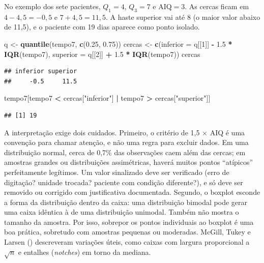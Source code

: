 \documentclass[
]{book}
\newenvironment{Shaded}{\begin{snugshade}}{\end{snugshade}}
\newcommand{\AttributeTok}[1]{\textcolor[rgb]{0.13,0.29,0.53}{#1}}
\newcommand{\DecValTok}[1]{\textcolor[rgb]{0.00,0.00,0.81}{#1}}
\newcommand{\FloatTok}[1]{\textcolor[rgb]{0.00,0.00,0.81}{#1}}
\newcommand{\FunctionTok}[1]{\textcolor[rgb]{0.13,0.29,0.53}{\textbf{#1}}}
\newcommand{\NormalTok}[1]{#1}
\newcommand{\OtherTok}[1]{\textcolor[rgb]{0.56,0.35,0.01}{#1}}
\newcommand{\SpecialCharTok}[1]{\textcolor[rgb]{0.81,0.36,0.00}{\textbf{#1}}}
\newcommand{\StringTok}[1]{\textcolor[rgb]{0.31,0.60,0.02}{#1}}
\begin{document}
No exemplo dos sete pacientes, \(Q_1 = 4\), \(Q_3 = 7\) e \(\text{AIQ} = 3\). As cercas ficam em \(4 - 4{,}5 = -0{,}5\) e \(7 + 4{,}5 = 11{,}5\). A haste superior vai até 8 (o maior valor abaixo de 11,5), e o paciente com 19 dias aparece como ponto isolado.

\begin{Shaded}
\begin{Highlighting}[]
\NormalTok{q }\OtherTok{\textless{}{-}} \FunctionTok{quantile}\NormalTok{(tempo7, }\FunctionTok{c}\NormalTok{(}\FloatTok{0.25}\NormalTok{, }\FloatTok{0.75}\NormalTok{))}
\NormalTok{cercas }\OtherTok{\textless{}{-}} \FunctionTok{c}\NormalTok{(}\AttributeTok{inferior =}\NormalTok{ q[[}\DecValTok{1}\NormalTok{]] }\SpecialCharTok{{-}} \FloatTok{1.5} \SpecialCharTok{*} \FunctionTok{IQR}\NormalTok{(tempo7), }\AttributeTok{superior =}\NormalTok{ q[[}\DecValTok{2}\NormalTok{]] }\SpecialCharTok{+} \FloatTok{1.5} \SpecialCharTok{*} \FunctionTok{IQR}\NormalTok{(tempo7))}
\NormalTok{cercas}
\end{Highlighting}
\end{Shaded}

\begin{verbatim}
## inferior superior 
##     -0.5     11.5
\end{verbatim}

\begin{Shaded}
\begin{Highlighting}[]
\NormalTok{tempo7[tempo7 }\SpecialCharTok{\textless{}}\NormalTok{ cercas[}\StringTok{"inferior"}\NormalTok{] }\SpecialCharTok{|}\NormalTok{ tempo7 }\SpecialCharTok{\textgreater{}}\NormalTok{ cercas[}\StringTok{"superior"}\NormalTok{]]}
\end{Highlighting}
\end{Shaded}

\begin{verbatim}
## [1] 19
\end{verbatim}

A interpretação exige dois cuidados. Primeiro, o critério de 1,5 × AIQ é uma convenção para chamar atenção, e não uma regra para excluir dados. Em uma distribuição normal, cerca de 0,7\% das observações caem além das cercas; em amostras grandes ou distribuições assimétricas, haverá muitos pontos ``atípicos'' perfeitamente legítimos. Um valor sinalizado deve ser verificado (erro de digitação? unidade trocada? paciente com condição diferente?), e só deve ser removido ou corrigido com justificativa documentada. Segundo, o boxplot esconde a forma da distribuição dentro da caixa: uma distribuição bimodal pode gerar uma caixa idêntica à de uma distribuição unimodal. Também não mostra o tamanho da amostra. Por isso, sobrepor os pontos individuais ao boxplot é uma boa prática, sobretudo com amostras pequenas ou moderadas. McGill, Tukey e Larsen () descreveram variações úteis, como caixas com largura proporcional a \(\sqrt{n}\) e entalhes (\emph{notches}) em torno da mediana.
\end{document}
